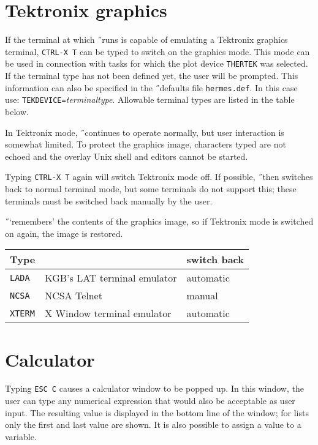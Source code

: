 \section{Tektronix graphics}
If the terminal at which \H\ runs is capable of emulating a Tektronix
graphics terminal, {\tt CTRL-X T}\label{ctrlxt} can be typed to switch on
the graphics mode.
This mode can be used in connection with tasks for which the
plot device {\tt THERTEK} was selected.
If the terminal type has not been defined yet, the user will be prompted.
This information can also be specified in the \H\ defaults file
{\tt hermes.def}. In this case use: {\tt TEKDEVICE=}{\it terminaltype\/}.
Allowable terminal types are listed in the table below.

In Tektronix mode, \H\ continues to operate normally,
but user interaction is somewhat limited. To protect the
graphics image, characters typed are not echoed and the overlay Unix shell
and editors cannot be started.

Typing {\tt CTRL-X T} again will switch Tektronix mode off.
If possible, \H\ then switches back to normal terminal mode, but some
terminals do not support this; these terminals must be switched back
manually by the user.

\H\ `remembers' the contents of the graphics image, so if Tektronix mode is
switched on again, the image is restored.

\vspace{5mm}
\begin{center}
\begin{tabular}{|l|l|l|}
\hline
Type&&switch back\\
\hline
{\tt LADA}&KGB's LAT terminal emulator&automatic\\
{\tt NCSA}&NCSA Telnet&manual\\
{\tt XTERM}&X Window terminal emulator&automatic\\
\hline
\end{tabular}
\end{center}

\section{Calculator}
\label{calculator}
Typing {\tt ESC C} causes a calculator window to be popped up.
In this window, the user can type any numerical expression that would also
be acceptable as user input. The resulting value is displayed in the bottom
line of the window; for lists only the first and last value are shown.
It is also possible to assign a value to a variable.

